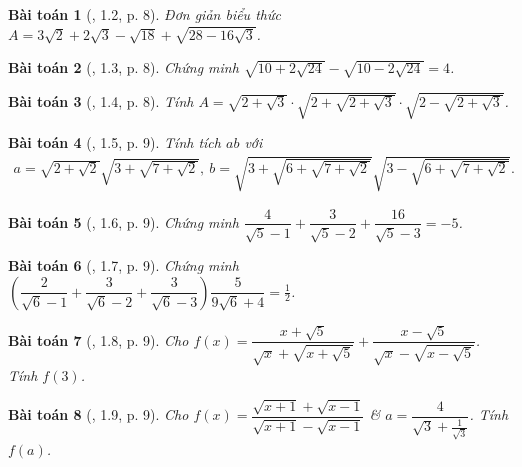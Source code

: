 \documentclass{article}
\newtheorem{baitoan}{Bài toán}
\begin{document}
\begin{baitoan}[\cite{TLCT_THCS_Toan_9_dai_so}, 1.2, p. 8]
	Đơn giản biểu thức $A = 3\sqrt{2} + 2\sqrt{3} - \sqrt{18} + \sqrt{28 - 16\sqrt{3}}$.
\end{baitoan}

\begin{baitoan}[\cite{TLCT_THCS_Toan_9_dai_so}, 1.3, p. 8]
	Chứng minh $\sqrt{10 + 2\sqrt{24}} - \sqrt{10 - 2\sqrt{24}} = 4$.
\end{baitoan}

\begin{baitoan}[\cite{TLCT_THCS_Toan_9_dai_so}, 1.4, p. 8]
	Tính $A = \sqrt{2 + \sqrt{3}}\cdot\sqrt{2 + \sqrt{2 + \sqrt{3}}}\cdot\sqrt{2 - \sqrt{2 + \sqrt{3}}}$.
\end{baitoan}

\begin{baitoan}[\cite{TLCT_THCS_Toan_9_dai_so}, 1.5, p. 9]
	Tính tích $ab$ với
	\begin{align*}
		a = \sqrt{2 + \sqrt{2}}\sqrt{3 + \sqrt{7 + \sqrt{2}}},\ b = \sqrt{3 + \sqrt{6 + \sqrt{7 + \sqrt{2}}}}\sqrt{3 - \sqrt{6 + \sqrt{7 + \sqrt{2}}}}.
	\end{align*}
\end{baitoan}

\begin{baitoan}[\cite{TLCT_THCS_Toan_9_dai_so}, 1.6, p. 9]
	Chứng minh $\dfrac{4}{\sqrt{5} - 1} + \dfrac{3}{\sqrt{5} - 2} + \dfrac{16}{\sqrt{5} - 3} = -5$.
\end{baitoan}

\begin{baitoan}[\cite{TLCT_THCS_Toan_9_dai_so}, 1.7, p. 9]
	Chứng minh $\left(\dfrac{2}{\sqrt{6} - 1} + \dfrac{3}{\sqrt{6} - 2} + \dfrac{3}{\sqrt{6} - 3}\right)\dfrac{5}{9\sqrt{6} + 4} = \frac{1}{2}$.
\end{baitoan}

\begin{baitoan}[\cite{TLCT_THCS_Toan_9_dai_so}, 1.8, p. 9]
	Cho $f(x) = \dfrac{x + \sqrt{5}}{\sqrt{x} + \sqrt{x + \sqrt{5}}} + \dfrac{x - \sqrt{5}}{\sqrt{x} - \sqrt{x - \sqrt{5}}}$. Tính $f(3)$.
\end{baitoan}

\begin{baitoan}[\cite{TLCT_THCS_Toan_9_dai_so}, 1.9, p. 9]
	Cho $f(x) = \dfrac{\sqrt{x + 1} + \sqrt{x - 1}}{\sqrt{x + 1} - \sqrt{x - 1}}$ \& $a = \dfrac{4}{\sqrt{3} + \frac{1}{\sqrt{3}}}$. Tính $f(a)$.
\end{baitoan}
\end{document}
